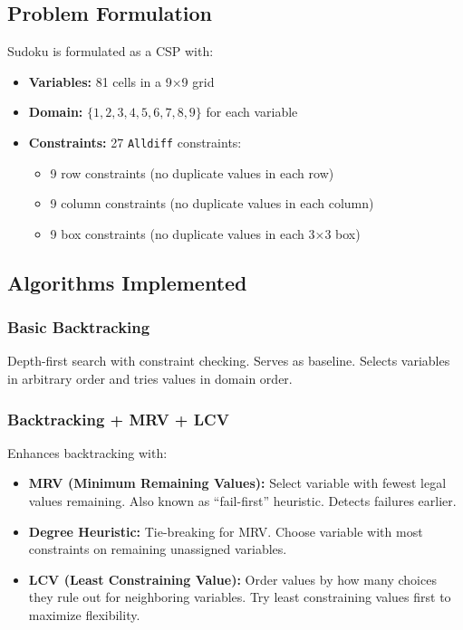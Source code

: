 \documentclass[letterpaper]{article}
\begin{document}
\subsection{Problem Formulation}

Sudoku is formulated as a CSP with:
\begin{itemize}
\item \textbf{Variables:} 81 cells in a 9×9 grid
\item \textbf{Domain:} $\{1, 2, 3, 4, 5, 6, 7, 8, 9\}$ for each variable
\item \textbf{Constraints:} 27 \texttt{Alldiff} constraints:
  \begin{itemize}
  \item 9 row constraints (no duplicate values in each row)
  \item 9 column constraints (no duplicate values in each column)
  \item 9 box constraints (no duplicate values in each 3×3 box)
  \end{itemize}
\end{itemize}

\subsection{Algorithms Implemented}

\subsubsection{Basic Backtracking}
Depth-first search with constraint checking. Serves as baseline. Selects variables in arbitrary order and tries values in domain order.

\subsubsection{Backtracking + MRV + LCV}
Enhances backtracking with:
\begin{itemize}
\item \textbf{MRV (Minimum Remaining Values):} Select variable with fewest legal values remaining. Also known as ``fail-first'' heuristic. Detects failures earlier.
\item \textbf{Degree Heuristic:} Tie-breaking for MRV. Choose variable with most constraints on remaining unassigned variables.
\item \textbf{LCV (Least Constraining Value):} Order values by how many choices they rule out for neighboring variables. Try least constraining values first to maximize flexibility.
\end{itemize}
\end{document}
